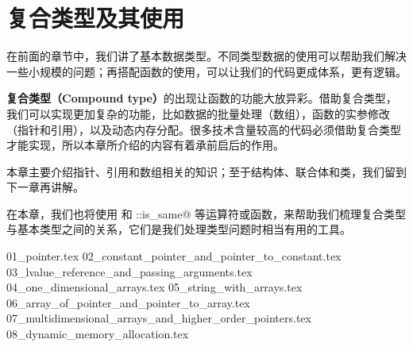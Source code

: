 \chapter{复合类型及其使用}
在前面的章节中，我们讲了基本数据类型。不同类型数据的使用可以帮助我们解决一些小规模的问题；再搭配函数的使用，可以让我们的代码更成体系，更有逻辑。\par
\textbf{复合类型（Compound type）}的出现让函数的功能大放异彩。借助复合类型，我们可以实现更加复杂的功能，比如数据的批量处理（数组），函数的实参修改（指针和引用），以及动态内存分配。很多技术含量较高的代码必须借助复合类型才能实现，所以本章所介绍的内容有着承前启后的作用。\par
本章主要介绍指针、引用和数组相关的知识；至于结构体、联合体和类，我们留到下一章再讲解。\par
在本章，我们也将使用 \lstinline@typeid@ 和 \lstinline@std::is_same@ 等运算符或函数，来帮助我们梳理复合类型与基本类型之间的关系，它们是我们处理类型问题时相当有用的工具。\par
{01_pointer.tex}
{02_constant_pointer_and_pointer_to_constant.tex}
{03_lvalue_reference_and_passing_arguments.tex}
{04_one_dimensional_arrays.tex}
{05_string_with_arrays.tex}
{06_array_of_pointer_and_pointer_to_array.tex}
{07_multidimensional_arrays_and_higher_order_pointers.tex}
{08_dynamic_memory_allocation.tex}